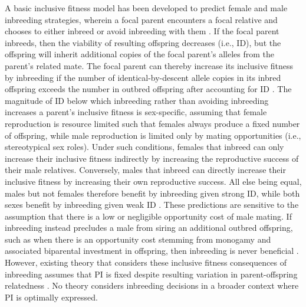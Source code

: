 \documentclass[10pt,letterpaper]{article}
\begin{document}
A basic inclusive fitness model has been developed to predict female and male inbreeding strategies, wherein a focal parent encounters a focal relative and chooses to either inbreed or avoid inbreeding with them \cite[][]{Parker1979, Parker2006, Kokko2006, Duthie2015a}. If the focal parent inbreeds, then the viability of resulting offspring decreases (i.e., ID), but the offspring will inherit additional copies of the focal parent's alleles from the parent's related mate. The focal parent can thereby increase its inclusive fitness by inbreeding if the number of identical-by-descent allele copies in its inbred offspring exceeds the number in outbred offspring after accounting for ID \cite[][]{Parker1979, Parker2006, Kokko2006, Szulkin2012, Duthie2015a}. The magnitude of ID below which inbreeding rather than avoiding inbreeding increases a parent's inclusive fitness is sex-specific, assuming that female reproduction is resource limited such that females always produce a fixed number of offspring, while male reproduction is limited only by mating opportunities (i.e., stereotypical sex roles). Under such conditions, females that inbreed can only increase their inclusive fitness indirectly by increasing the reproductive success of their male relatives. Conversely, males that inbreed can directly increase their inclusive fitness by increasing their own reproductive success. All else being equal, males but not females therefore benefit by inbreeding given strong ID, while both sexes benefit by inbreeding given weak ID \cite[][]{Parker1979, Parker2006, Kokko2006, Duthie2015a}. These predictions are sensitive to the assumption that there is a low or negligible opportunity cost of male mating. If inbreeding instead precludes a male from siring an additional outbred offspring, such as when there is an opportunity cost stemming from monogamy and associated biparental investment in offspring, then inbreeding is never beneficial \cite[][]{Waser1986}. However, existing theory that considers these inclusive fitness consequences of inbreeding assumes that PI is fixed despite resulting variation in parent-offspring relatedness \cite[][]{Trivers1974, Lynch1998, Reid2016}. No theory considers inbreeding decisions in a broader context where PI is optimally expressed.
\end{document}
